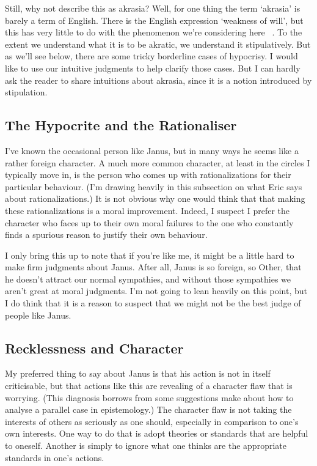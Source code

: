 Still, why not describe this as akrasia? Well, for one thing the term `akrasia' is barely a term of English. There is the English expression `weakness of will', but this has very little to do with the phenomenon we're considering here ~\citep{Holton1999}. To the extent we understand what it is to be akratic, we understand it stipulatively. But as we'll see below, there are some tricky borderline cases of hypocrisy. I would like to use our intuitive judgments to help clarify those cases. But I can hardly ask the reader to share intuitions about akrasia, since it is a notion introduced by stipulation.

\subsection{The Hypocrite and the Rationaliser}
\label{thehypocriteandtherationaliser}

I've known the occasional person like \gls{Janus}, but in many ways he seems like a rather foreign character. A much more common character, at least in the circles I typically move in, is the person who comes up with rationalizations for their particular behaviour. (I'm drawing heavily in this subsection on what Eric \citet{Schwitzgebel2011} says about rationalizations.) It is not obvious why one would think that that making these rationalizations is a moral improvement. Indeed, I suspect I prefer the character who faces up to their own moral failures to the one who constantly finds a spurious reason to justify their own behaviour.

I only bring this up to note that if you're like me, it might be a little hard to make firm judgments about \gls{Janus}. After all, \gls{Janus} is so foreign, so Other, that he doesn't attract our normal sympathies, and without those sympathies we aren't great at moral judgments. I'm not going to lean heavily on this point, but I do think that it is a reason to suspect that we might not be the best judge of people like \gls{Janus}.

\subsection{Recklessness and Character}
\label{recklessnessandcharacter}

My preferred thing to say about \gls{Janus} is that his action is not in itself criticisable, but that actions like this are revealing of a character flaw that is worrying. (This diagnosis borrows from some suggestions \citet{HawthorneSrinivasan2013} make about how to analyse a parallel case in epistemology.) The character flaw is not taking the interests of others as seriously as one should, especially in comparison to one's own interests. One way to do that is adopt theories or standards that are helpful to oneself. Another is simply to ignore what one thinks are the appropriate standards in one's actions.

